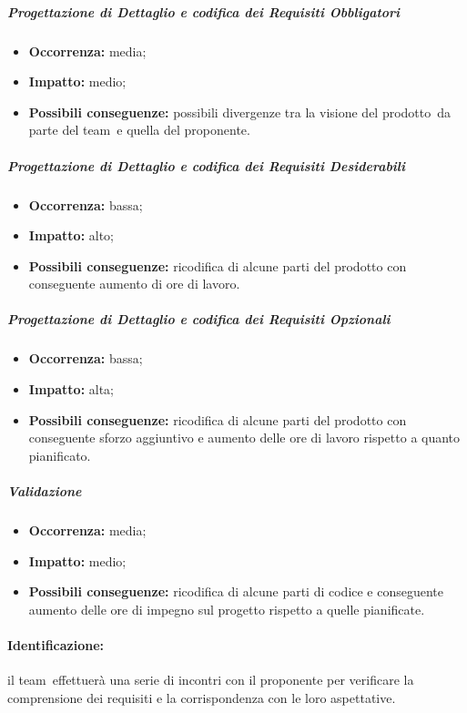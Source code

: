 \documentclass[../PianoProgetto.tex]{subfiles}
\begin{document}
		\subparagraph*{Progettazione di Dettaglio e codifica dei Requisiti Obbligatori}
			\begin{itemize}[label={-}]
				\item \textbf{Occorrenza:} media;
				\item \textbf{Impatto:} medio;
				\item \textbf{Possibili conseguenze:} possibili divergenze tra la visione del prodotto\g\ da parte del team\g\ e quella del proponente.
			\end{itemize}
			
		\subparagraph*{Progettazione di Dettaglio e codifica dei Requisiti Desiderabili}
			\begin{itemize}[label={-}]
				\item \textbf{Occorrenza:} bassa;
				\item \textbf{Impatto:} alto;
				\item \textbf{Possibili conseguenze:} ricodifica di alcune parti del prodotto con conseguente aumento di ore di lavoro.
			\end{itemize}
			
		\subparagraph*{Progettazione di Dettaglio e codifica dei Requisiti Opzionali}
			\begin{itemize}[label={-}]
				\item \textbf{Occorrenza:} bassa;
				\item \textbf{Impatto:} alta;
				\item \textbf{Possibili conseguenze:} ricodifica di alcune parti del prodotto con conseguente sforzo aggiuntivo e aumento delle ore di lavoro rispetto a quanto pianificato.
			\end{itemize}
			
		\subparagraph*{Validazione}
			\begin{itemize}[label={-}]
				\item \textbf{Occorrenza:} media;
				\item \textbf{Impatto:} medio;
				\item \textbf{Possibili conseguenze:} ricodifica di alcune parti di codice e conseguente aumento delle ore di impegno sul progetto rispetto a quelle pianificate.
			\end{itemize}
		
	\paragraph*{Identificazione:} il team\g\ effettuerà una serie di incontri con il proponente per verificare la comprensione dei requisiti e la corrispondenza con le loro aspettative.
	
\end{document}
